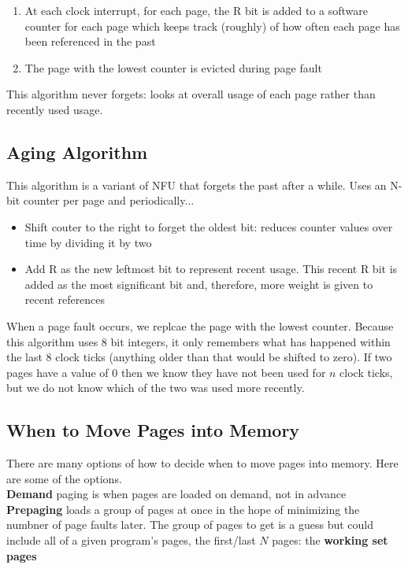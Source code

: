 \documentclass{article}
\newcommand{\bold}[1]{\textbf{#1}}
\renewcommand{\b}{\item[$\circ$]}
\newcommand{\newlist}{\begin{itemize}}
\renewcommand{\endlist}{\end{itemize}}
\begin{document}
\begin{enumerate}
    \item At each clock interrupt, for each page, the R bit is added to a software counter for each page which keeps track (roughly) of how often each page has been referenced in the past 
    \item The page with the lowest counter is evicted during page fault
\end{enumerate}

This algorithm never forgets: looks at overall usage of each page rather than recently used usage. 

\subsection{Aging Algorithm}

This algorithm is a variant of NFU that forgets the past after a while. Uses an N-bit counter per page and periodically...

\newlist 
\b Shift couter to the right to forget the oldest bit: reduces counter values over time by dividing it by two
\b Add R as the new leftmost bit to represent recent usage. This recent R bit is added as the most significant bit and, therefore, more weight is given to recent references
\endlist 

When a page fault occurs, we replcae the page with the lowest counter. Because this algorithm uses 8 bit integers, it only remembers what has happened within the last 8 clock ticks (anything older than that would be shifted to zero). If two pages have a value of 0 then we know they have not been used for $n$ clock ticks, but we do not know which of the two was used more recently. 

\subsection{When to Move Pages into Memory}

There are many options of how to decide when to move pages into memory. Here are some of the options. \\ 

\bold{Demand} paging is when pages are loaded on demand, not in advance \\ 

\bold{Prepaging} loads a group of pages at once in the hope of minimizing the numbner of page faults later. The group of pages to get is a guess but could include all of a given program's pages, the first/last $N$ pages: the \bold{working set pages} \\ 
\end{document}
